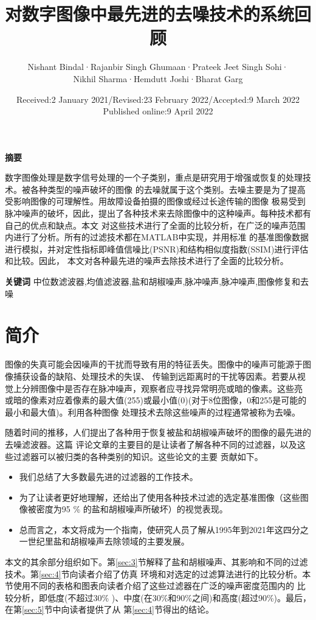 \documentclass[12pt]{article} %
\title{对数字图像中最先进的去噪技术的系统回顾}  %
\author{Nishant Bindal·Rajanbir Singh Ghumaan·Prateek Jeet Singh Sohi·
 \\Nikhil Sharma·Hemdutt Joshi·Bharat Garg}%
\date{Received:2 January 2021/Revised:23 February 2022/Accepted:9 March 2022
\\Published online:9 April 2022}       %
\begin{document}
\maketitle          %

\textbf{摘要}

数字图像处理是数字信号处理的一个子类别，重点是研究用于增强或恢复的处理技术。被各种类型的噪声破坏的图像
的去噪就属于这个类别。去噪主要是为了提高受影响图像的可理解性。用故障设备拍摄的图像或经过长途传输的图像
极易受到脉冲噪声的破坏，因此，提出了各种技术来去除图像中的这种噪声。每种技术都有自己的优点和缺点。本文
对这些技术进行了全面的比较分析，在广泛的噪声范围内进行了分析。所有的过滤技术都在MATLAB中实现，并用标准
的基准图像数据进行模拟，并对定性指标即峰值信噪比(PSNR)和结构相似度指数(SSIM)进行评估和比较。因此，
本文对各种最先进的噪声去除技术进行了全面的比较分析。
\bigskip

\textbf{关键词}
\quad 中位数滤波器,均值滤波器,盐和胡椒噪声,脉冲噪声,脉冲噪声,图像修复和去噪

\section{简介}
图像的失真可能会因噪声的干扰而导致有用的特征丢失。图像中的噪声可能源于图像捕获设备的缺陷、处理技术的失误、
传输到远距离时的干扰等因素。若要从视觉上分辨图像中是否存在脉冲噪声，观察者应寻找异常明亮或暗的像素。这些亮
或暗的像素对应着像素的最大值(255)或最小值(0)(对于8位图像，0和255是可能的最小和最大值)。利用各种图像
处理技术去除这些噪声的过程通常被称为去噪。\par

\hspace{2em}随着时间的推移，人们提出了各种用于恢复被盐和胡椒噪声破坏的图像的最先进的去噪滤波器。这篇
评论文章的主要目的是让读者了解各种不同的过滤器，以及这些过滤器可以被归类的各种类别的知识。这些论文的主要
贡献如下。

\begin{itemize}
\item 我们总结了大多数最先进的过滤器的工作技术。
\item 为了让读者更好地理解，还给出了使用各种技术过滤的选定基准图像（这些图像被密度为95 \% 的盐和胡椒噪声所破坏）的视觉表现。
\item 总而言之，本文将成为一个指南，使研究人员了解从1995年到2021年这四分之一世纪里盐和胡椒噪声去除领域的主要发展。
\end{itemize}

\hspace{2em}本文的其余部分组织如下。第\ref{sec:3}节解释了盐和胡椒噪声、其影响和不同的过滤技术。第\ref{sec:4}节向读者介绍了仿真
环境和对选定的过滤算法进行的比较分析。本节使用不同的表格和图表向读者介绍了这些过滤器在广泛的噪声密度范围内的
比较分析，即低度(不超过30\% )、中度(在30\%和90\%之间)和高度(超过90\%)。最后，在第\ref{sec:5}节中向读者提供了从
第\ref{sec:4}节得出的结论。
\end{document}
